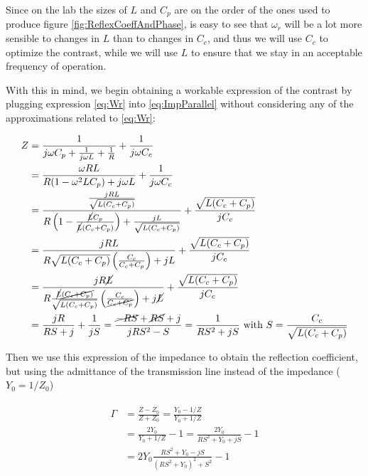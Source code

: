 \documentclass[../main.tex]{subfiles}
\begin{document}
Since on the lab the sizes of \(L\) and \(C_{p}\) are on the order of the ones used to
produce figure \ref{fig:ReflexCoeffAndPhase}, is easy to see that \(\omega_{r}\)
will be a lot more sensible to changes in \(L\) than to changes in \(C_{c}\),
and thus we will use \(C_{c}\) to optimize the contrast, while we will use \(L\)
to ensure that we stay in an acceptable frequency of operation.

With this in mind, we begin obtaining a workable expression of the contrast
by plugging expression \ref{eq:Wr} into \ref{eq:ImpParallel} without
considering any of the approximations related to \ref{eq:Wr}:

\begin{align}
\label{eq:ImpParallelResonant}
\begin{split}
    Z &= \frac{1}{j \omega C_{p} + \frac{1}{j \omega L} + \frac{1}{R}}
        + \frac{1}{j \omega C_{c}}\\
      &= \frac{  \omega R L}{R(1 - \omega^2 L C_{p}) + j \omega L}
        + \frac{1}{j \omega C_{c}}\\
      &= \frac{\frac{j R L}{\sqrt{L (C_{c} + C_{p})}}}{
          R\left(1 - \frac{\cancel{L} C_{p}}{\cancel{L}(C_{c} + C_{p})}\right)
            + \frac{j L}{\sqrt{L (C_{c} + C_{p})}}
            } + \frac{\sqrt{L (C_{c} + C_{p})}}{j C_{c}}\\
      &= \frac{j R L}{R\sqrt{L (C_{c} + C_{p})}
          \left(\frac{C_{c}}{C_{c} + C_{p}}\right) + j L}
          + \frac{\sqrt{L (C_{c} + C_{p})}}{j C_{c}}\\
      &= \frac{j R \cancel{L}}{R\frac{\cancel{L} \cancel{(C_{c} + C_{p})}}{
          \sqrt{L (C_{c} + C_{p})}}
          \left(\frac{C_{c}}{\cancel{C_{c} + C_{p}}}\right) + j \cancel{L}}
          + \frac{\sqrt{L (C_{c} + C_{p})}}{j C_{c}}\\
      &= \frac{j R}{RS + j} + \frac{1}{jS}
       = \frac{\cancel{-RS} + \cancel{RS} + j}{jRS^2 -S}
       = \frac{1}{RS^2 + jS}
       \text{ with } S = \frac{C_{c}}{\sqrt{L(C_{c} + C_{p})}}
\end{split}
\end{align}

Then we use this expression of the impedance to obtain the reflection coefficient,
but using the admittance of the transmission line instead of the impedance
(\(Y_{0} = 1/Z_{0}\))

\begin{align}
\begin{split}
    \Gamma &= \frac{Z - Z_{0}}{Z + Z_{0}} = \frac{Y_{0} - 1/Z}{Y_{0} + 1/Z}\\
           &= \frac{2Y_{0}}{Y_{0} + 1/Z} - 1 = \frac{2 Y_{0}}{RS^2 + Y_{0} + jS} - 1\\
           &= 2 Y_{0}\frac{RS^2 + Y_{0} - jS}{(RS^2 + Y_{0})^2 + S^2} - 1
\end{split}
\end{align}
\end{document}
